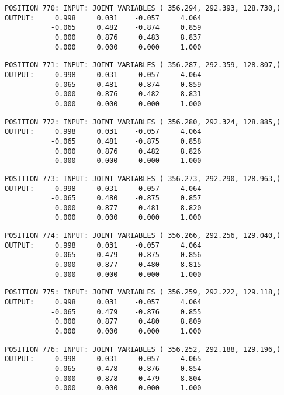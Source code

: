 \begin{verbatim}
POSITION 770: INPUT: JOINT VARIABLES ( 356.294, 292.393, 128.730,)
OUTPUT:     0.998     0.031    -0.057     4.064
           -0.065     0.482    -0.874     0.859
            0.000     0.876     0.483     8.837
            0.000     0.000     0.000     1.000
\end{verbatim} \pagebreak[1]\begin{verbatim}
POSITION 771: INPUT: JOINT VARIABLES ( 356.287, 292.359, 128.807,)
OUTPUT:     0.998     0.031    -0.057     4.064
           -0.065     0.481    -0.874     0.859
            0.000     0.876     0.482     8.831
            0.000     0.000     0.000     1.000
\end{verbatim} \pagebreak[1]\begin{verbatim}
POSITION 772: INPUT: JOINT VARIABLES ( 356.280, 292.324, 128.885,)
OUTPUT:     0.998     0.031    -0.057     4.064
           -0.065     0.481    -0.875     0.858
            0.000     0.876     0.482     8.826
            0.000     0.000     0.000     1.000
\end{verbatim} \pagebreak[1]\begin{verbatim}
POSITION 773: INPUT: JOINT VARIABLES ( 356.273, 292.290, 128.963,)
OUTPUT:     0.998     0.031    -0.057     4.064
           -0.065     0.480    -0.875     0.857
            0.000     0.877     0.481     8.820
            0.000     0.000     0.000     1.000
\end{verbatim} \pagebreak[1]\begin{verbatim}
POSITION 774: INPUT: JOINT VARIABLES ( 356.266, 292.256, 129.040,)
OUTPUT:     0.998     0.031    -0.057     4.064
           -0.065     0.479    -0.875     0.856
            0.000     0.877     0.480     8.815
            0.000     0.000     0.000     1.000
\end{verbatim} \pagebreak[1]\begin{verbatim}
POSITION 775: INPUT: JOINT VARIABLES ( 356.259, 292.222, 129.118,)
OUTPUT:     0.998     0.031    -0.057     4.064
           -0.065     0.479    -0.876     0.855
            0.000     0.877     0.480     8.809
            0.000     0.000     0.000     1.000
\end{verbatim} \pagebreak[1]\begin{verbatim}
POSITION 776: INPUT: JOINT VARIABLES ( 356.252, 292.188, 129.196,)
OUTPUT:     0.998     0.031    -0.057     4.065
           -0.065     0.478    -0.876     0.854
            0.000     0.878     0.479     8.804
            0.000     0.000     0.000     1.000
\end{verbatim} \pagebreak[1]\begin{verbatim}

\end{verbatim}
